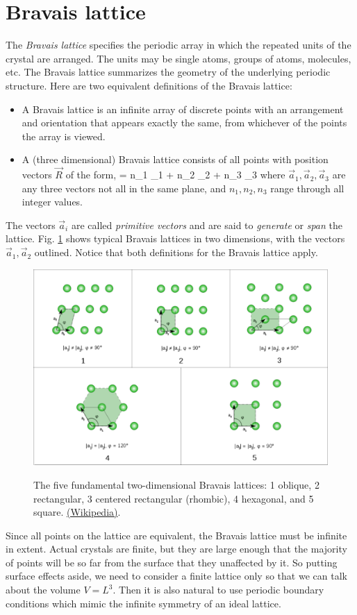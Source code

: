 \documentclass{Textbook}
\begin{document}
\section{Bravais lattice}
The \emph{Bravais lattice} specifies the periodic array in which the repeated units of the crystal are arranged. The units may be single atoms, groups of atoms, molecules, etc. The Bravais lattice summarizes the geometry of the underlying periodic structure. Here are two equivalent definitions of the Bravais lattice:
\begin{itemize}
\item A Bravais lattice is an infinite array of discrete points with an arrangement and orientation that appears exactly the same, from whichever of the points the array is viewed.
\item A (three dimensional) Bravais lattice consists of all points with position vectors $\vec{R}$ of the form,
\be 
{} = n_1 _1 + n_2 _2 + n_3 _3 
\ee
where $\vec{a}_1,\vec{a}_2,\vec{a}_3$ are any three vectors not all in the same plane, and $n_1,n_2,n_3$ range through all integer values. 
\end{itemize}
The vectors $\vec{a}_i$ are called \emph{primitive vectors} and are said to \emph{generate} or \emph{span} the lattice.\nl
Fig. \ref{fig:bravais_2d} shows typical Bravais lattices in two dimensions, with the vectors $\vec{a}_1,\vec{a}_2$ outlined. Notice that both definitions for the Bravais lattice apply.
\begin{figure}[!ht]
  \centering
  \includegraphics[width=14cm]{bravais_2d.pdf}\\
  \caption{The five fundamental two-dimensional Bravais lattices: 1 oblique, 2 rectangular, 3 centered rectangular (rhombic), 4 hexagonal, and 5 square. \href{http://en.wikipedia.org/wiki/Bravais_lattice}{(Wikipedia)}.}
  \label{fig:bravais_2d}
\end{figure}
Since all points on the lattice are equivalent, the Bravais lattice must be infinite in extent. Actual crystals are finite, but they are large enough that the majority of points will be so far from the surface that they unaffected by it. So putting surface effects aside, we need to consider a finite lattice only so that we can talk about the volume $V=L^3$. Then it is also natural to use periodic boundary conditions which mimic the infinite symmetry of an ideal lattice.
\end{document}
